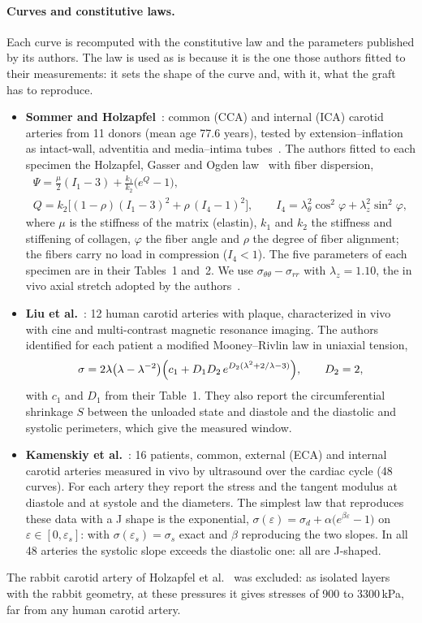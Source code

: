 \paragraph{Curves and constitutive laws.} Each curve is recomputed with the constitutive law and the parameters published by its authors. The law is used as is because it is the one those authors fitted to their measurements: it sets the shape of the curve and, with it, what the graft has to reproduce.
\begin{itemize}
\item \textbf{Sommer and Holzapfel}~\cite{sommer}: common (CCA) and internal (ICA) carotid arteries from 11 donors (mean age 77.6 years), tested by extension--inflation as intact-wall, adventitia and media--intima tubes~\cite{sommer2010}. The authors fitted to each specimen the Holzapfel, Gasser and Ogden law~\cite{holzapfel} with fiber dispersion,
\begin{gather*}
\Psi=\tfrac{\mu}{2}(I_1-3)+\tfrac{k_1}{k_2}\bigl(e^{Q}-1\bigr),\\
Q=k_2\bigl[(1-\rho)(I_1-3)^2+\rho\,(I_4-1)^2\bigr],\qquad I_4=\lambda_\theta^2\cos^2\varphi+\lambda_z^2\sin^2\varphi,
\end{gather*}
where $\mu$ is the stiffness of the matrix (elastin), $k_1$ and $k_2$ the stiffness and stiffening of collagen, $\varphi$ the fiber angle and $\rho$ the degree of fiber alignment; the fibers carry no load in compression ($I_4<1$). The five parameters of each specimen are in their Tables~1 and~2. We use $\sigma_{\theta\theta}-\sigma_{rr}$ with $\lambda_z=1.10$, the in vivo axial stretch adopted by the authors~\cite{sommer2010}.
\item \textbf{Liu et al.}~\cite{liu}: 12 human carotid arteries with plaque, characterized in vivo with cine and multi-contrast magnetic resonance imaging. The authors identified for each patient a modified Mooney--Rivlin law in uniaxial tension,
\begin{equation*}
\sigma=2\lambda\bigl(\lambda-\lambda^{-2}\bigr)\Bigl(c_1+D_1D_2\,e^{D_2(\lambda^2+2/\lambda-3)}\Bigr),\qquad D_2=2,
\end{equation*}
with $c_1$ and $D_1$ from their Table~1. They also report the circumferential shrinkage $S$ between the unloaded state and diastole and the diastolic and systolic perimeters, which give the measured window.
\item \textbf{Kamenskiy et al.}~\cite{kamenskiy}: 16 patients, common, external (ECA) and internal carotid arteries measured in vivo by ultrasound over the cardiac cycle (48 curves). For each artery they report the stress and the tangent modulus at diastole and at systole and the diameters. The simplest law that reproduces these data with a J shape is the exponential, $\sigma(\varepsilon)=\sigma_d+\alpha\bigl(e^{\beta\varepsilon}-1\bigr)$ on $\varepsilon\in[0,\varepsilon_s]$: with $\sigma(\varepsilon_s)=\sigma_s$ exact and $\beta$ reproducing the two slopes. In all 48 arteries the systolic slope exceeds the diastolic one: all are J-shaped.
\end{itemize}
The rabbit carotid artery of Holzapfel et al.~\cite{holzapfel} was excluded: as isolated layers with the rabbit geometry, at these pressures it gives stresses of 900 to 3300\,kPa, far from any human carotid artery.

